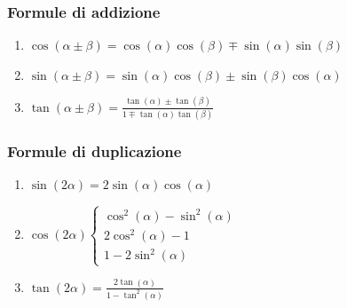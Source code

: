         \subsubsection{Formule di addizione}\label{Trigonometria_Addizione}
            \begin{enumerate}
                \item {
                    $\cos(\alpha \pm \beta) = \cos(\alpha)\cos(\beta) \mp \sin(\alpha)\sin(\beta)$
                }
                \item {
                    $\sin(\alpha \pm \beta) = \sin(\alpha)\cos(\beta) \pm \sin(\beta)\cos(\alpha)$
                }
                \item {
                    $\tan(\alpha \pm \beta) = \frac{\tan(\alpha) \pm \tan(\beta)}{1 \mp \tan(\alpha)\tan(\beta)} $
                }
            \end{enumerate}
        \subsubsection{Formule di duplicazione}\label{Trigonometria_Duplicazione}
            \begin{enumerate}
                \item {
                    $\sin(2\alpha) =2\sin(\alpha)\cos(\alpha)$ 
                }
                \item {
                    $
                        \cos(2\alpha)
                        \begin{cases}
                            \cos^2(\alpha) - \sin^2(\alpha) \\
                            2\cos^2(\alpha)-1\\
                            1-2\sin^2(\alpha)
                        \end{cases}
                    $
                }
                \item {
                    $\tan(2\alpha) =\frac{2\tan(\alpha)}{1-\tan^2(\alpha)}$ 
                }
            \end{enumerate}
